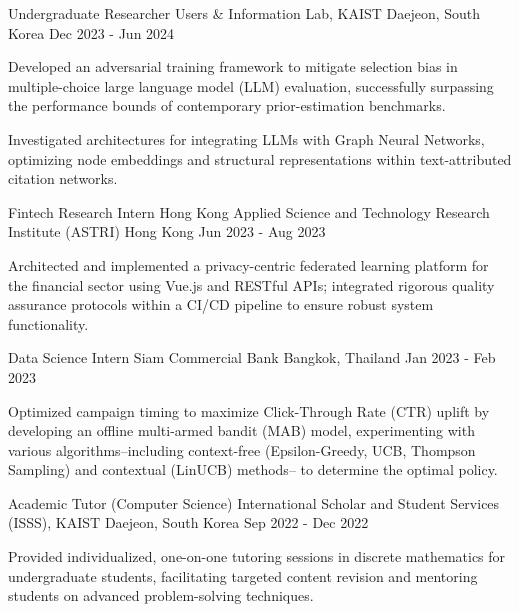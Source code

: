 \begin{cventries}
  \cventry
    {Undergraduate Researcher} %
    {Users \& Information Lab, KAIST} %
    {Daejeon, South Korea} %
    {Dec 2023 - Jun 2024} %
    {
      \begin{cvitems} %
        \item {Developed an adversarial training framework to mitigate selection bias in multiple-choice large language model (LLM) evaluation, successfully surpassing the performance bounds of contemporary prior-estimation benchmarks.}
        \item {Investigated architectures for integrating LLMs with Graph Neural Networks, optimizing node embeddings and structural representations within text-attributed citation networks.}
      \end{cvitems}
    }

  \cventry
    {Fintech Research Intern} %
    {Hong Kong Applied Science and Technology Research Institute (ASTRI)} %
    {Hong Kong} %
    {Jun 2023 - Aug 2023} %
    {
      \begin{cvitems} %
        \item {Architected and implemented a privacy-centric federated learning platform for the financial sector using Vue.js and RESTful APIs; integrated rigorous quality assurance protocols within a CI/CD pipeline to ensure robust system functionality.}
      \end{cvitems}
    }

  \cventry
    {Data Science Intern} %
    {Siam Commercial Bank} %
    {Bangkok, Thailand} %
    {Jan 2023 - Feb 2023} %
    {
      \begin{cvitems} %
        \item {Optimized campaign timing to maximize Click-Through Rate (CTR) uplift by developing an offline multi-armed bandit (MAB) model, experimenting with various algorithms–including context-free (Epsilon-Greedy, UCB, Thompson Sampling) and contextual (LinUCB) methods– to determine the optimal policy.}
      \end{cvitems}
    }

  \cventry
    {Academic Tutor (Computer Science)} %
    {International Scholar and Student Services (ISSS), KAIST} %
    {Daejeon, South Korea} %
    {Sep 2022 - Dec 2022} %
    {
      \begin{cvitems} %
        \item {Provided individualized, one-on-one tutoring sessions in discrete mathematics for undergraduate students, facilitating targeted content revision and mentoring students on advanced problem-solving techniques.}
      \end{cvitems}
    }


\end{cventries}
